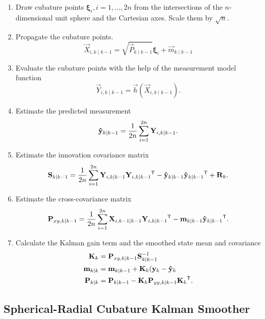 \begin{enumerate}

  \item Draw cubature points $\boldsymbol{\xi}_i, i=1,\ldots,2n$ from the intersections of the $n$-dimensional unit sphere and the Cartesian axes. Scale them by $\sqrt{n}$.

  \item Propagate the cubature points.%
%
    $$ \vec{X}_{i,k \mid k-1} = \sqrt{\vec{P}_{k \mid k-1}} \boldsymbol{\xi}_i + \vec{m}_{k \mid k-1}$$

  \item Evaluate the cubature points with the help of the measurement model function%
%
    $$ \vec{Y}_{i,k \mid k-1} = \vec{h}(\vec{X}_{i,k \mid k-1}). $$

  \item Estimate the predicted measurement%
%
    $$ \vec{\hat{y}}_{k \mid k-1} = {1 \over 2 n} \sum_{i=1}^{2 n} \vec{Y}_{i,k \mid k-1}. $$

  \item Estimate the innovation covariance matrix%
%
    $$ \vec{S}_{k \mid k-1} = {1 \over 2 n} \sum_{i=1}^{2 n} \vec{Y}_{i,k \mid k-1} \vec{Y}_{i,k \mid k-1}\T - \vec{\hat{y}}_{k \mid k-1} \vec{\hat{y}}_{k \mid k-1}\T + \vec{R}_k.$$

  \item Estimate the cross-covariance matrix%
%
    $$ \vec{P}_{xy,k \mid k-1} = {1 \over 2 n} \sum_{i=1}^{2 n} \vec{X}_{i,k-1 \mid k-1} \vec{Y}_{i,k \mid k-1}\T - \vec{m}_{k \mid k-1} \vec{\hat{y}}_{k \mid k-1}\T.$$ 

  \item Calculate the Kalman gain term and the smoothed state mean and covariance %
%
  \begin{align*}
     \vec{K}_k &= \vec{P}_{xy,k \mid k-1} \vec{S}_{k \mid k-1}^{-1} \\
     \vec{m}_{k \mid k} &= \vec{m}_{k \mid k-1} + \vec{K}_k(\vec{y}_k - \vec{\hat{y}}_{k} \\ 
     \vec{P}_{k \mid k} &= \vec{P}_{k \mid k-1} - \vec{K}_k \vec{P}_{yy,k \mid k-1} \vec{K}_k\T.
  \end{align*}
\end{enumerate}






%
\subsection{Spherical-Radial Cubature Kalman Smoother}
%

